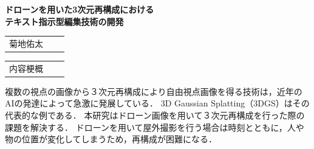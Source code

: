 \documentclass[a4paper,dvipdfmx,ja=standard,9pt]{bxjsarticle}
\begin{document}
\setlength{\intextsep}{18pt}      %
\setlength{\textfloatsep}{30pt}   %
\setlength{\floatsep}{18pt}        %
\setlength{\belowcaptionskip}{30pt}  %

  \begin{center}
    \vspace{14truept}
    {\sffamily\bfseries  
    \fontsize{16\ascpt}{25\ascpt}\selectfont
    ドローンを用いた3次元再構成における\\テキスト指示型編集技術の開発

    }
    \par
    \vspace{40truept}

    {\fontsize{14\ascpt}{10.5\ascpt}\selectfont
      \begin{tabular}{@{}ccc@{}}
        菊地佑太 \\
      \end{tabular}
    }

    \end{center}

    \vspace{50truept}

 \begin{center}

   {\sffamily\bfseries\fontsize{11\ascpt}{10.5\ascpt}\selectfont
      \begin{tabular}{@{}ccc@{}}
        内容梗概 \\
      \end{tabular}
    }
 \end{center}

\vspace{25truept}
    

\fontsize{11\ascpt}{16truept}\selectfont %
\setlength{\baselineskip}{20pt}%






複数の視点の画像から３次元再構成により自由視点画像を得る技術は，近年のAIの発達によって急激に発展している．
3D Gaussian Splatting（3DGS）はその代表的な例である．
本研究はドローン画像を用いて３次元再構成を行った際の課題を解決する．
ドローンを用いて屋外撮影を行う場合は時刻とともに，人や物の位置が変化してしまうため，再構成が困難になる．
\end{document}
